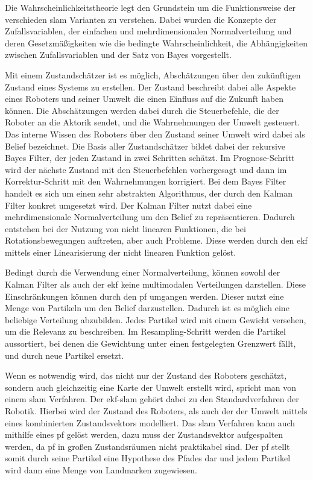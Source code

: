 Die Wahrscheinlichkeitstheorie legt den Grundstein um die Funktionsweise der verschieden \gls{slam} Varianten zu verstehen. Dabei wurden die Konzepte der Zufallsvariablen, der einfachen und mehrdimensionalen Normalverteilung und deren Gesetzmäßigkeiten wie die bedingte Wahrscheinlichkeit, die Abhängigkeiten zwischen Zufallsvariablen und der Satz von Bayes vorgestellt.

Mit einem Zustandschätzer ist es möglich, Abschätzungen über den zukünftigen Zustand eines Systems zu erstellen. Der Zustand beschreibt dabei alle Aspekte eines Roboters und seiner Umwelt die einen Einfluss auf die Zukunft haben können. Die Abschätzungen werden dabei durch die Steuerbefehle, die der Roboter an die Aktorik sendet, und die Wahrnehmungen der Umwelt gesteuert. Das interne Wissen des Roboters über den Zustand seiner Umwelt wird dabei als Belief bezeichnet. Die Basis aller Zustandschätzer bildet dabei der rekursive Bayes Filter, der jeden Zustand in zwei Schritten schätzt. Im Prognose-Schritt wird der nächste Zustand mit den Steuerbefehlen vorhergesagt und dann im Korrektur-Schritt mit den Wahrnehmungen korrigiert. Bei dem Bayes Filter handelt es sich um einen sehr abstrakten Algorithmus, der durch den Kalman Filter konkret umgesetzt wird. Der Kalman Filter nutzt dabei eine mehrdimensionale Normalverteilung um den Belief zu repräsentieren. Dadurch entstehen bei der Nutzung von nicht linearen Funktionen, die bei Rotationsbewegungen auftreten, aber auch Probleme. Diese werden durch den \gls{ekf} mittels einer Linearisierung der nicht linearen Funktion gelöst.

Bedingt durch die Verwendung einer Normalverteilung, können sowohl der Kalman Filter als auch der \gls{ekf} keine multimodalen Verteilungen darstellen. Diese Einschränkungen können durch den \gls{pf} umgangen werden. Dieser nutzt eine Menge von Partikeln um den Belief darzustellen. Dadurch ist es möglich eine beliebige Verteilung abzubilden. Jedes Partikel wird mit einem Gewicht versehen, um die Relevanz zu beschreiben. Im Resampling-Schritt werden die Partikel aussortiert, bei denen die Gewichtung unter einen festgelegten Grenzwert fällt, und durch neue Partikel ersetzt.

Wenn es notwendig wird, das nicht nur der Zustand des Roboters geschätzt, sondern auch gleichzeitig eine Karte der Umwelt erstellt wird, spricht man von einem \gls{slam} Verfahren. Der \gls{ekf}-\gls{slam} gehört dabei zu den Standardverfahren der Robotik. Hierbei wird der Zustand des Roboters, als auch der der Umwelt mittels eines kombinierten Zustandsvektors modelliert. Das \gls{slam} Verfahren kann auch mithilfe eines \gls{pf} gelöst werden, dazu muss der Zustandsvektor aufgespalten werden, da \gls{pf} in großen Zustandsräumen nicht praktikabel sind. Der \gls{pf} stellt somit durch seine Partikel eine Hypothese des Pfades dar und jedem Partikel wird dann eine Menge von Landmarken zugewiesen.

